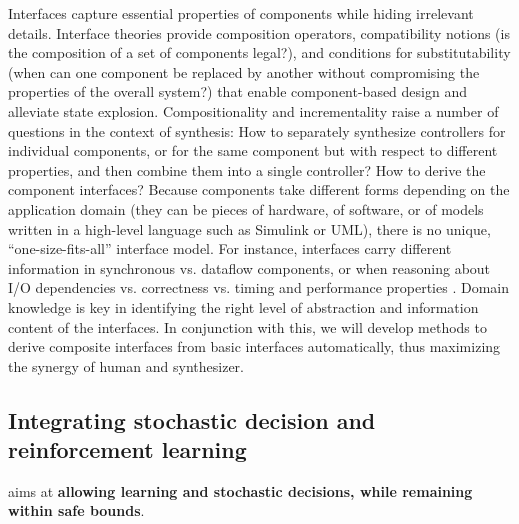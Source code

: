 Interfaces capture essential properties of components while hiding
irrelevant details. Interface theories \cite{AlfaroH01} provide
composition operators, compatibility notions (is the composition of a
set of components legal?), and conditions for substitutability (when
can one component be replaced by another without compromising the
properties of the overall system?) that enable component-based design
and alleviate state explosion. Compositionality and incrementality
raise a number of questions in the context of synthesis: How to
separately synthesize controllers for individual components, or for
the same component but with respect to different properties, and then
combine them into a single controller? How to derive the component
interfaces? Because components take different forms depending on the
application domain (they can be pieces of hardware, of software, or of
models written in a high-level language such as Simulink or UML),
there is no unique, “one-size-fits-all” interface model. For instance,
interfaces carry different information in synchronous vs. dataflow
components, or when reasoning about I/O dependencies vs. correctness
vs. timing and performance properties \cite{LublinermanT08,LublinermanST09,TripakisLHL11}. Domain knowledge is key in
identifying the right level of abstraction and information content of
the interfaces. In conjunction with this, we will develop methods to
derive composite interfaces from basic interfaces automatically, thus
maximizing the synergy of human and synthesizer.

\subsection{Integrating stochastic decision and reinforcement learning} 

\project aims at \textbf{allowing learning and stochastic decisions, while remaining within safe bounds}.


